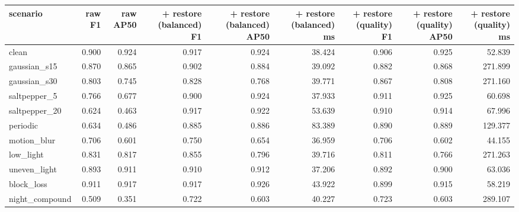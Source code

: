 \begin{tabular}{lrrrrrrrr}
\toprule
scenario & raw F1 & raw AP50 & + restore (balanced) F1 & + restore (balanced) AP50 & + restore (balanced) ms & + restore (quality) F1 & + restore (quality) AP50 & + restore (quality) ms \\
\midrule
clean & 0.900 & 0.924 & 0.917 & 0.924 & 38.424 & 0.906 & 0.925 & 52.839 \\
gaussian_s15 & 0.870 & 0.865 & 0.902 & 0.884 & 39.092 & 0.882 & 0.868 & 271.899 \\
gaussian_s30 & 0.803 & 0.745 & 0.828 & 0.768 & 39.771 & 0.867 & 0.808 & 271.160 \\
saltpepper_5 & 0.766 & 0.677 & 0.900 & 0.924 & 37.933 & 0.911 & 0.925 & 60.698 \\
saltpepper_20 & 0.624 & 0.463 & 0.917 & 0.922 & 53.639 & 0.910 & 0.914 & 67.996 \\
periodic & 0.634 & 0.486 & 0.885 & 0.886 & 83.389 & 0.890 & 0.889 & 129.377 \\
motion_blur & 0.706 & 0.601 & 0.750 & 0.654 & 36.959 & 0.706 & 0.602 & 44.155 \\
low_light & 0.831 & 0.817 & 0.855 & 0.796 & 39.716 & 0.811 & 0.766 & 271.263 \\
uneven_light & 0.893 & 0.911 & 0.910 & 0.912 & 37.206 & 0.892 & 0.900 & 63.036 \\
block_loss & 0.911 & 0.917 & 0.917 & 0.926 & 43.922 & 0.899 & 0.915 & 58.219 \\
night_compound & 0.509 & 0.351 & 0.722 & 0.603 & 40.227 & 0.723 & 0.603 & 289.107 \\
\bottomrule
\end{tabular}
